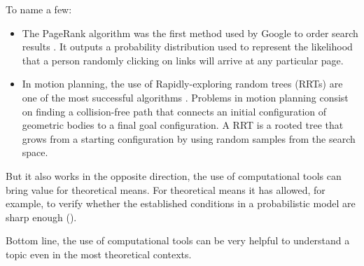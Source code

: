 To name a few:
\begin{itemize}
\item The PageRank algorithm was the first method used by Google to order search results \cite[Page 99]{pageRank}. It outputs a probability distribution used to represent the likelihood that a person randomly clicking on links will arrive at any particular page.
\item In motion planning, the use of Rapidly-exploring random trees (RRTs) are one of the most successful algorithms \cite[Alcazar 15]{Alcazar15}. Problems in motion planning consist on finding a collision-free path that connects an initial configuration of geometric bodies to a final goal configuration. A RRT is a rooted tree that grows from a starting configuration by using random samples from the search space.
\end{itemize}

But it also works in the opposite direction, the use of computational tools can bring value for theoretical means. For theoretical means it has allowed, for example, to verify whether the established conditions in a probabilistic model are sharp enough (\cite[Aronshtam 13]{Meshulam13}).

Bottom line, the use of computational tools can be very helpful to understand a topic even in the most theoretical contexts.